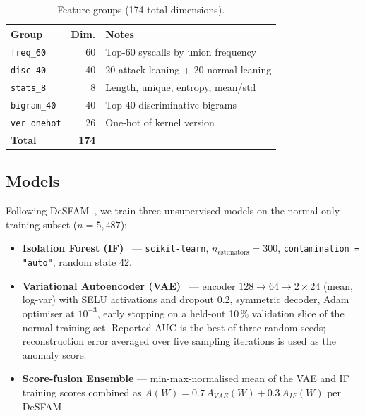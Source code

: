 \documentclass[conference,10pt]{IEEEtran}
\begin{document}
\begin{table}[t]
\centering
\caption{Feature groups (174 total dimensions).}
\label{tab:features}
\begin{tabular}{lrl}
\toprule
\textbf{Group} & \textbf{Dim.} & \textbf{Notes}\\
\midrule
\texttt{freq\_60}     & 60 & Top-60 syscalls by union frequency\\
\texttt{disc\_40}     & 40 & 20 attack-leaning + 20 normal-leaning\\
\texttt{stats\_8}     &  8 & Length, unique, entropy, mean/std\\
\texttt{bigram\_40}   & 40 & Top-40 discriminative bigrams\\
\texttt{ver\_onehot}  & 26 & One-hot of kernel version\\
\midrule
\textbf{Total}        &\textbf{174} &\\
\bottomrule
\end{tabular}
\end{table}

\subsection{Models}
\label{sec:models}

Following DeSFAM~\cite{desfam2025access}, we train three unsupervised
models on the normal-only training subset ($n = 5{,}487$):

\begin{itemize}
  \item \textbf{Isolation Forest (IF)}~\cite{liu2008iforest} ---
        \texttt{scikit-learn}, $n_{\text{estimators}} = 300$,
        \texttt{contamination = "auto"}, random state 42.
  \item \textbf{Variational Autoencoder (VAE)}~\cite{kingma2014vae} ---
        encoder $128 \to 64 \to 2 \times 24$ (mean, log-var) with SELU
        activations and dropout 0.2, symmetric decoder, Adam optimiser at
        $10^{-3}$, early stopping on a held-out 10\,\% validation slice
        of the normal training set. Reported AUC is the best of three
        random seeds; reconstruction error averaged over five sampling
        iterations is used as the anomaly score.
  \item \textbf{Score-fusion Ensemble} --- min-max-normalised mean of
        the VAE and IF training scores combined as
        $A(W) = 0.7\,A_{VAE}(W) + 0.3\,A_{IF}(W)$
        per DeSFAM~\cite{desfam2025access}.
\end{itemize}
\end{document}
